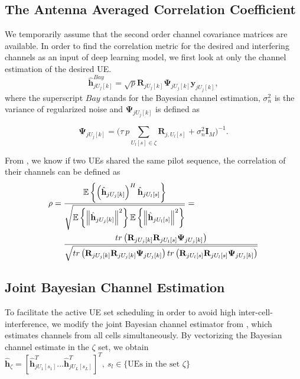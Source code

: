 \subsection{The Antenna Averaged Correlation Coefficient}
We temporarily assume that the second order channel covariance matrices are available. 
In order to find the correlation metric for the desired and interfering channels as an input of deep learning model, we first look at only the channel estimation of the desired UE.
\begin{equation}
\hat{\mathbf{h}}^{Bay}_{jU_j[k]} = \sqrt{p}\mathbf{R}_{jU_j[k]} \mathbf{\Psi}_{jU_j[k]} \mathbf{y}_{jU_j[k]}, 
\end{equation}
where the superscript $Bay$ stands for the Bayesian channel estimation, $\sigma_{n}^{2}$ is the variance of regularized noise and $\mathbf{\Psi}_{jU_j[k]}$ is defined as

\begin{equation}
\mathbf{\Psi}_{jU_j[k]} = \Bigg(\tau\:{p}\sum_{U_l[s]\in\zeta} \mathbf{R}_{j,U_l[s]} + \sigma^2_n \mathbf{I}_M\Bigg)^{-1}.
\label{eq:psi_function}
\end{equation}

From \cite{bjornson2017massive}, we know if two UEs shared the same pilot sequence, the correlation of their channels can be defined as
\begin{equation}
\begin{split}
\rho={} &
\frac{\operatorname{\mathbb{E}}\left\{ \left(\hat{\mathbf{h}}_{jU_{j}[k]}\right)^{H}\hat{\mathbf{h}}_{jU_{l}[s]}\right\} }{\sqrt{\operatorname{\mathbb{E}}\left\{ \left\Vert \hat{\mathbf{h}}_{jU_{j}[k]}\right\Vert ^{2}\right\} \operatorname{\mathbb{E}}\left\{ \left\Vert \hat{\mathbf{h}}_{jU_{l}[s]}\right\Vert ^{2}\right\} }}=\\
& \frac{tr\left(\mathbf{R}_{jU_{j}[k]}\mathbf{R}_{jU_{l}[s]}\mathbf{\Psi}_{jU_{j}[k]}\right)}{\sqrt{tr\left(\mathbf{R}_{jU_{j}[k]}\mathbf{R}_{jU_{j}[k]}\mathbf{\Psi}_{jU_{j}[k]}\right)tr\left(\mathbf{R}_{jU_{l}[s]}\mathbf{R}_{jU_{l}[s]}\mathbf{\Psi}_{jU_{j}[k]}\right)}}
\end{split}
\end{equation}

\subsection{Joint Bayesian Channel Estimation}
To facilitate the active UE set scheduling in order to avoid high inter-cell-interference, we modify the joint Bayesian channel estimator from \cite{yin2013coordinated}, which estimates channels from all cells simultaneously. By vectorizing the Bayesian channel estimate in the $\zeta$ set, we obtain $\hat{\mathbf{h}}_{\zeta}=[\hat{\mathbf{h}}_{jU_{1}[s_{1}]}^{T}...\hat{\mathbf{h}}_{jU_{L}[s_{L}]}^{T}]^{T},\:s_{l}\in \{\text{UEs in the set } \zeta\}$ 

